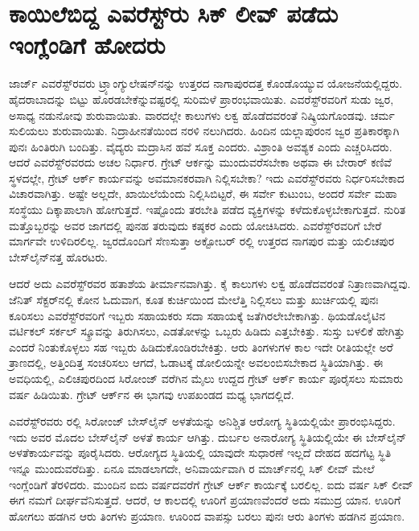 
\chapter{ಕಾಯಿಲೆಬಿದ್ದ ಎವರೆಸ್ಟ್​ರು ಸಿಕ್​ ಲೀವ್​ ಪಡೆದು ಇಂಗ್ಲೆಂಡಿಗೆ ಹೋದರು}

ಜಾರ್ಜ್ ಎವರೆಸ್ಟ್​ರವರು ಟ್ರ್ಯಾಂಗ್ಯುಲೇಷನ್​ನನ್ನು ಉತ್ತರದ ನಾಗಾಪುರದತ್ತ ಕೊಂಡೊಯ್ಯುವ ಯೋಜನೆಯಲ್ಲಿದ್ದರು. ಹೈದರಾಬಾದನ್ನು ಬಿಟ್ಟು ಹೊರಡಬೇಕೆನ್ನುವಷ್ಟರಲ್ಲಿ ಸುರಿಮಳೆ ಪ್ರಾರಂಭವಾಯಿತು. ಎವರೆಸ್ಟ್​ರವರಿಗೆ ಸುಡು ಜ್ವರ, ಅಸಾಧ್ಯ ನಡುನೋವು ಶುರುವಾಯಿತು. ವಾರದಲ್ಲೇ ಕಾಲುಗಳು ಲಕ್ವ ಹೊಡೆದವರಂತೆ ನಿಷ್ಕ್ರಿಯಗೊಂಡವು. ಚರ್ಮ ಸುಲಿಯಲು ಶುರುವಾಯಿತು. ನಿದ್ರಾಹೀನತೆಯಿಂದ ನರಳಿ ನಲುಗಿದರು. ಹಿಂದಿನ ಯಲ್ಲಾಪುರಂನ ಜ್ವರ ಪ್ರತಿಕಾರಕ್ಕಾಗಿ ಪುನಃ ಹಿಂತಿರುಗಿ ಬಂದಿತ್ತು. ವೈದ್ಯರು ಮದ್ರಾಸಿನ ಹವೆ ಸೂಕ್ತ ಎಂದರು. ವಿಶ್ರಾಂತಿ ಅವಶ್ಯಕ ಎಂದು ಎಚ್ಚರಿಸಿದರು. ಆದರೆ ಎವರೆಸ್ಟ್​ರವರದು ಅಚಲ ನಿರ್ಧಾರ. ಗ್ರೇಟ್​ ಆರ್ಕನ್ನು ಮುಂದುವರೆಸಬೇಕಾ ಅಥವಾ ಈ ಬೇರಾರ್​ ಕಣಿವೆ ಸ್ಥಳದಲ್ಲೇ, ಗ್ರೇಟ್​ ಆರ್ಕ್ ಕಾರ್ಯವನ್ನು ಅವಮಾನಕರವಾಗಿ ನಿಲ್ಲಿಸಬೇಕಾ? ಇದು ಎವರೆಸ್ಟ್​ರವರು ನಿರ್ಧರಿಸಬೇಕಾದ ವಿಚಾರವಾಗಿತ್ತು. ಅಷ್ಟೇ ಅಲ್ಲದೇ, ಖಾಯಿಲೆಯೆಂದು ನಿಲ್ಲಿಸಿಬಿಟ್ಟರೆ, ಈ ಸರ್ವೇ ಕುಟುಂಬ, ಅಂದರೆ ಸರ್ವೇ ಮಹಾ ಸಂಸ್ಥೆಯು ದಿಕ್ಕಾಪಾಲಾಗಿ ಹೋಗುತ್ತದೆ. ಇಷ್ಟೊಂದು ತರಬೇತಿ ಪಡೆದ ವ್ಯಕ್ತಿಗಳನ್ನು ಕಳೆದುಕೊಳ್ಳಬೇಕಾಗುತ್ತದೆ. ನುರಿತ ಮತ್ತೊಬ್ಬರನ್ನು ಅವರ ಜಾಗದಲ್ಲಿ ಪುನಹ ತರುವುದು ಕಷ್ಠಕರ ಎಂದು ಯೋಚಿಸಿದರು. ಎವರೆಸ್ಟ್​ರವರಿಗೆ ಬೇರೆ ಮಾರ್ಗವೇ ಉಳಿದಿರಲಿಲ್ಲ. ಜ್ವರದೊಂದಿಗೆ ಸೆಣಸುತ್ತಾ ಅಕ್ಟೋಬರ್​ ರಲ್ಲಿ ಉತ್ತರದ ನಾಗಪುರ ಮತ್ತು ಯಲಿಚಪುರ ಬೇಸ್‌ಲೈನ್​ನತ್ತ ಹೊರಟರು.

ಆದರೆ ಅದು ಎವರೆಸ್ಟ್​ರವರ ಹತಾಶೆಯ ತೀರ್ಮಾನವಾಗಿತ್ತು. ಕೈ ಕಾಲುಗಳು ಲಕ್ವ ಹೊಡೆದವರಂತೆ ನಿತ್ರಾಣವಾಗಿದ್ದವು. ಜೆನಿತ್​ ಸೆಕ್ಟರ್​ನಲ್ಲಿ ಕೋನ ಓದುವಾಗ, ಕೂತ ಕುರ್ಚಿಯಿಂದ ಮೇಲೆತ್ತಿ ನಿಲ್ಲಿಸಲು ಮತ್ತು ಖುರ್ಚಿಯಲ್ಲಿ ಪುನಃ ಕೂರಿಸಲು ಎವರೆಸ್ಟ್​ರವರಿಗೆ ಇಬ್ಬರು ಸಹಾಯಕರು ಸದಾ ಸಹಾಯಕ್ಕೆ ಜತೆಗಿರಲೇಬೇಕಾಗಿತ್ತು. ಥಿಯಡೊಲೈಟಿನ ವರ್ಟಿಕಲ್​ ಸರ್ಕಲ್​ ಸ್ಕ್ರೂವನ್ನು ತಿರುಗಿಸಲು, ಎಡತೋಳನ್ನು ಒಬ್ಬರು ಹಿಡಿದು ಎತ್ತಬೇಕಿತ್ತು. ಸುಸ್ತು ಬಳಲಿಕೆ ಹೇಗಿತ್ತು ಎಂದರೆ ನಿಂತುಕೊಳ್ಳಲು ಸಹ ಇಬ್ಬರು ಹಿಡಿದುಕೊಂಡಿರಬೇಕಿತ್ತು. ಆರು ತಿಂಗಳುಗಳ ಕಾಲ ಇದೇ ರೀತಿಯಲ್ಲೇ ಅರೆ ತ್ರಾಣದಲ್ಲಿ, ಅತ್ತಿಂದಿತ್ತ ಸಂಚರಿಸಲು ಆಗದೆ, ಓಡಾಟಕ್ಕೆ ಡೋಲಿಯನ್ನೇ ಅವಲಂಬಿಸಬೇಕಾದ ಸ್ಥಿತಿಯಾಗಿತ್ತು. ಈ ಅವಧಿಯಲ್ಲಿ, ಎಲಿಚಪುರದಿಂದ ಸಿರೋಂಜ್​ ವರೆಗಿನ  ಮೈಲು ಉದ್ದದ ಗ್ರೇಟ್​ ಆರ್ಕ್ ಕಾರ್ಯ ಪೂರೈಸಲು ಸುಮಾರು  ವರ್ಷ ಹಿಡಿಯಿತು. ಗ್ರೇಟ್​ ಆರ್ಕ್‌ನ ಈ ಭಾಗವು ಉಪಖಂಡದ ಮಧ್ಯ ಭಾಗದಲ್ಲಿದೆ.

ಎವರೆಸ್ಟ್​ರವರು ರಲ್ಲಿ ಸಿರೋಂಜ್​ ಬೇಸ್​ಲೈನ್​ ಅಳತೆಯನ್ನು ಅನಿಶ್ಚಿತ ಆರೋಗ್ಯ ಸ್ಥಿತಿಯಲ್ಲಿಯೇ ಪ್ರಾರಂಭಿಸಿದ್ದರು. ಇದು ಅವರ ಮೊದಲ ಬೇಸ್‌ಲೈನ್​ ಅಳತೆ ಕಾರ್ಯ ಆಗಿತ್ತು. ದುರ್ಬಲ ಅನಾರೋಗ್ಯ ಸ್ಥಿತಿಯಲ್ಲಿಯೇ ಈ ಬೇಸ್‌ಲೈನ್​ ಅಳತೆಕಾರ್ಯವನ್ನು ಪೂರೈಸಿದರು. ಆರೋಗ್ಯದ ಸ್ಥಿತಿಯಲ್ಲಿ ಯಾವುದೇ ಸುಧಾರಣೆ ಇಲ್ಲದೆ ದೇಹದ ಹದಗೆಟ್ಟ ಸ್ಥಿತಿ ಇನ್ನೂ ಮುಂದುವರೆದಿತ್ತು. ಏನೂ ಮಾಡಲಾಗದೇ, ಅನಿವಾರ್ಯವಾಗಿ ರ ಮಾರ್ಚ್‌ನಲ್ಲಿ ಸಿಕ್​ ಲೀವ್​ ಮೇಲೆ ಇಂಗ್ಲೆಂಡಿಗೆ ತೆರಳಿದರು. ಮುಂದಿನ ಐದು ವರ್ಷದವರೆಗೆ ಗ್ರೇಟ್​ ಆರ್ಕ್ ಕಾರ್ಯಕ್ಕೆ ಬರಲಿಲ್ಲ. ಐದು ವರ್ಷ ಸಿಕ್​ ಲೀವ್​ ಈಗ ನಮಗೆ ದೀರ್ಘವೆನಿಸುತ್ತದೆ. ಆದರೆ, ಆ ಕಾಲದಲ್ಲಿ ಊರಿಗೆ ಪ್ರಯಾಣವೆಂದರೆ ಅದು ಸಮುದ್ರ ಯಾನ. ಊರಿಗೆ ಹೋಗಲು ಹಡಗಿನ ಆರು ತಿಂಗಳು ಪ್ರಯಾಣ. ಊರಿಂದ ವಾಪಸ್ಸು ಬರಲು ಪುನಃ ಆರು ತಿಂಗಳು ಹಡಗಿನ ಪ್ರಯಾಣ.

